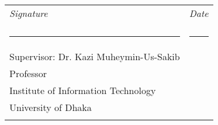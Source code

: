 \begin{tabular}{ll}
{\em Signature} & {\em Date}\\

\vspace{8mm} \\
\rule{9cm}{0.25mm} & \rule{3cm}{0.25mm} \\
Supervisor: Dr. Kazi Muheymin-Us-Sakib\\
Professor\\Institute of Information Technology\\ University of Dhaka\\
\vspace{8mm} \\
\end{tabular}

\clearpage
